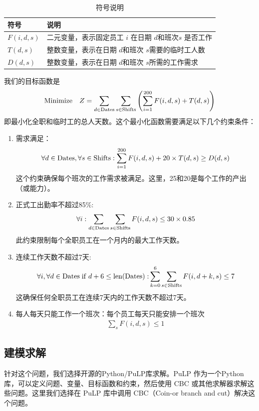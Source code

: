 \documentclass[UTF8]{article}%
\begin{document}
\begin{table}[!ht]
\caption{符号说明}%
\centering%
\begin{tabular}{p{4cm}<{\centering}p{10cm}<{\centering}}%
\toprule%
符号&说明 \\
\midrule%
$F(i,d,s)$&二元变量，表示固定员工 $i$ 在日期 $d $和班次$ s$ 是否工作\\
$T(d,s)$&整数变量，表示在日期 $d $和班次 $s $需要的临时工人数\\
$D(d,s)$&整数变量，表示在日期 $d $和班次 $s $所需的工作需求\\
\bottomrule%
\end{tabular}
\end{table}
我们的目标函数是
\begin{align*}
    {\rm Minimize}\quad Z =\sum_{d\in {\rm Dates}}\sum_{s\in {\rm Shifts}}\left(\sum_{i = 1}^{200}F(i,d,s)+T(d,s)\right)
\end{align*}
即最小化全职和临时工的总人天数。这个最小化函数需要满足以下几个约束条件：
\begin{enumerate}
    \item 需求满足：\begin{align*}
        \forall d\in {\rm Dates},\forall s\in {\rm Shifts}:\sum_{i = 1}^{200}F(i,d,s)+20\times T(d,s)\geq D(d,s)
    \end{align*}
    这个约束确保每个班次的工作需求被满足。这里，25和20是每个工作的产出（或能力）。
    \item 正式工出勤率不超过85\%: \begin{align*}
        \forall i:\sum_{d\in {\rm Dates}}\sum_{s\in {\rm Shifts}}F(i,d,s)\leq 30 \times 0.85
    \end{align*}此约束限制每个全职员工在一个月内的最大工作天数。
    \item 连续工作天数不超过7天:\begin{align*}
        \forall i,\forall d\in {\rm Dates\; if \;} d+6 \leq{\rm len(Dates):}\sum_{k =0}^6\sum_{s\in {\rm Shifts}}   F(i,d+k,s)\leq 7
    \end{align*}这确保任何全职员工在连续7天内的工作天数不超过7天。
    \item 每人每天只能工作一个班次：每个员工每天只能安排一个班次\begin{align*}
        \sum_s F(i,d,s)\leq 1
    \end{align*}
\end{enumerate}

\subsection{建模求解}
针对这个问题，我们选择开源的Python/PuLP库求解。PuLP 作为一个Python库，可以定义问题、变量、目标函数和约束，然后使用 CBC 或其他求解器求解这些问题。这里我们选择在 PuLP 库中调用 CBC（Coin-or branch and cut）解决这个问题。
\end{document}
